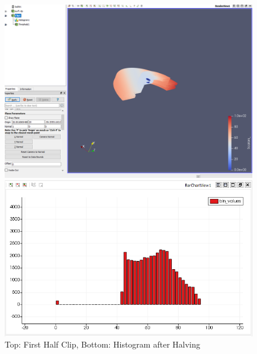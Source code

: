 \documentclass[a4paper,11pt]{article}
\theoremstyle{mytheor}
\begin{document}
\begin{figure}[!h]
    \centering
    \includegraphics[scale = 0.45]{Q3_Clip.PNG}
    
    \vspace{1 cm}
    \includegraphics[scale = 0.55]{Q3_H.PNG}
     \caption{Top: First Half Clip, Bottom: Histogram after Halving}
    \label{fig:q31}
\end{figure}
\end{document}
